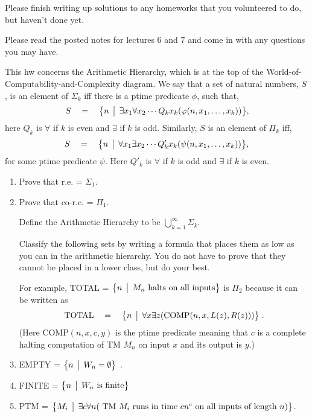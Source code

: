 \documentclass[12pt]{article}
\begin{document}
\thispagestyle{empty}
\noindent{}
\addtocounter{section}{6}

Please finish writing up solutions to any homeworks that you volunteered to do, but haven't done
yet.

Please read the posted notes for lectures 6 and 7 and come in with any questions you may have.


This hw concerns the Arithmetic Hierarchy, which is at the top
of the  World-of-Computability-and-Complexity diagram.  We say that a set
of natural numbers, $S$, is an element of $\Sigma_k$ iff there is a
ptime predicate $\phi$, such that,
\[ S \quad =\quad \bigl\{ n \,\bigm|\, \exists x_1\forall x_2 \cdots Q_k
x_k(\varphi(n,x_1,\ldots,x_k)) \bigr\},\]
here $Q_k$ is $\forall$ if $k$ is even and $\exists$ if $k$ is odd.
Similarly, $S$ is an element of $\Pi_k$ iff,
\[ S \quad =\quad \bigl\{ n \,\bigm|\, \forall x_1\exists x_2 \cdots Q'_k
x_k(\psi(n,x_1,\ldots,x_k)) \bigr\},\]
for some ptime predicate $\psi$.  Here $Q'_k$ is $\forall$ if
$k$ is odd and $\exists$ if $k$ is even. 


\begin{enumerate}
\item Prove that \quad r.e. = $\Sigma_1$.
\item Prove that \quad co-r.e. = $\Pi_1$.

\vspace*{.1in}


Define the Arithmetic Hierarchy to be $\displaystyle
\bigcup_{k=1}^\infty \Sigma_k$.


Classify the following sets by writing a  formula that
places them as low as you can in the arithmetic hierarchy.  
You do not have to prove that they cannot be placed in a lower class,
but do your best.  

For example,  
TOTAL  =  $\bigl\{ n \,\bigm|\, M_n\mbox{ halts on all inputs} \bigr\}$
is $\Pi_2$ because it can be written as
\[ \mbox{TOTAL} \quad =\quad \bigl\{ n \,\bigm|\, \forall x\exists
z(\mbox{COMP}(n,x,L(z),R(z))) \bigr\}\; .\]
(Here COMP$(n,x,c,y)$ is the ptime predicate meaning that $c$ is a complete halting computation of TM $M_n$
on input $x$ and its output is $y$.)




\item  EMPTY = $\bigl\{ n \,\bigm|\, W_n=\emptyset \bigr\}$ .
\item FINITE = $\bigl\{ n \,\bigm|\, W_n\mbox{ is finite} \bigr\}$ 
\item PTM  = $\bigl\{ M_i \,\bigm|\, \exists c \forall n(\mbox{ TM $M_i$ runs in time $cn^c$ on all inputs of length $n$}
  ) \bigr\}$.
\end{enumerate}
\end{document}
